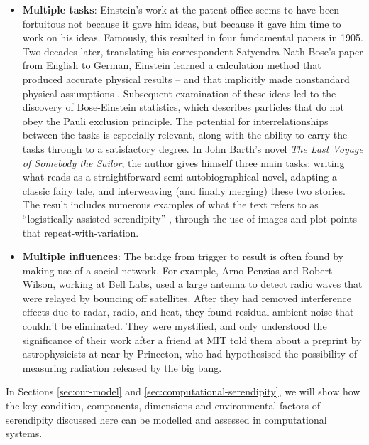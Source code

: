 \begin{itemize}
\item \textbf{Multiple tasks}: Einstein's work at the patent office
  seems to have been fortuitous not because it gave him ideas, but
  because it gave him time to work on his ideas.  Famously, this
  resulted in four fundamental papers in 1905.  Two decades later,
  translating his correspondent Satyendra Nath Bose's paper from
  English to German, Einstein learned a calculation method that
  produced accurate physical results -- and that implicitly made
  nonstandard physical assumptions \cite{delbruck1980bose}.
  Subsequent examination of these ideas led to the discovery of
  Bose-Einstein statistics, which describes particles that do not obey
  the Pauli exclusion principle.  The potential for interrelationships
  between the tasks is especially relevant, along with the ability to
  carry the tasks through to a satisfactory degree.  In John Barth's
  \citeyearpar{barth1992last} novel \emph{The Last Voyage of Somebody
    the Sailor}, the author gives himself three main tasks: writing
  what reads as a straightforward semi-autobiographical novel,
  adapting a classic fairy tale, and interweaving (and finally
  merging) these two stories.  The result includes numerous examples
  of what the text refers to as ``logistically assisted serendipity''
  \cite[p.~311]{barth1992last}, through the use of images and plot
  points that repeat-with-variation.
\end{itemize}

\begin{itemize}
\item \textbf{Multiple influences}: The bridge from trigger to result
  is often found by making use of a social network.  For example, Arno
  Penzias and Robert Wilson, working at Bell Labs, used a large
  antenna to detect radio waves that were relayed by bouncing off
  satellites.  After they had removed interference effects due to
  radar, radio, and heat, they found residual ambient noise that
  couldn't be eliminated.  They were mystified, and only understood
  the significance of their work after a friend at MIT told them about
  a preprint by astrophysicists at near-by Princeton, who had
  hypothesised the possibility of measuring radiation released by the
  big bang.
\end{itemize}

\noindent In Sections \ref{sec:our-model} and
\ref{sec:computational-serendipity}, we will show how the key
condition, components, dimensions and environmental factors of
serendipity discussed here can be modelled and assessed in
computational systems.

% 

